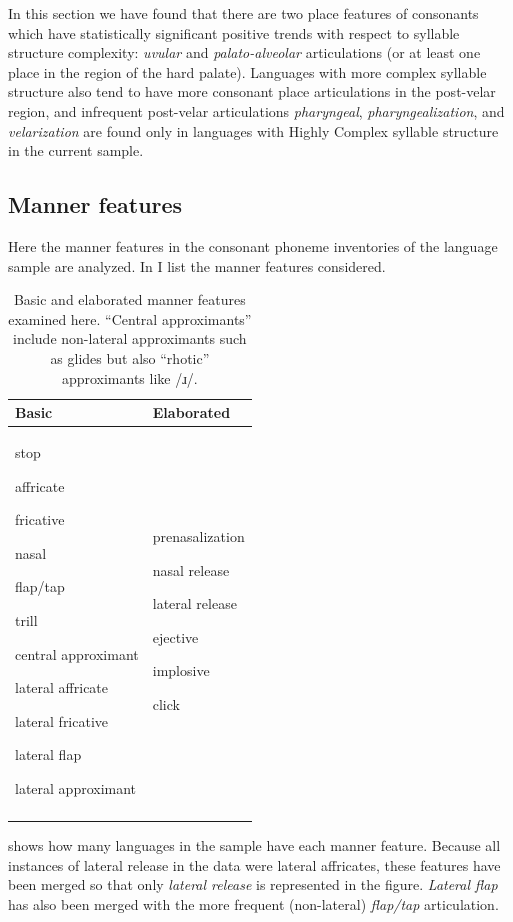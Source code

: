  In this section we have found that there are two place features of consonants which have statistically significant positive trends with respect to syllable structure complexity: \textit{uvular} and \textit{palato-alveolar} articulations (or at least one place in the region of the hard palate). Languages with more complex syllable structure also tend to have more consonant place articulations in the post-velar region, and infrequent post-velar articulations \textit{pharyngeal}, \textit{pharyngealization}, and \textit{velarization} are found only in languages with Highly Complex syllable structure in the current sample.

\subsection{Manner features}\label{sec:4.4.5}

  Here the manner features in the consonant phoneme inventories of the language sample are analyzed. In  I list the manner features considered.

\begin{table}
\begin{tabularx}{\textwidth}{QQ}
\lsptoprule
{Basic} & {Elaborated}\\\midrule
stop

affricate

fricative

nasal

flap/tap

trill

central approximant

lateral affricate

lateral fricative

lateral flap

lateral approximant & prenasalization

nasal release

lateral release

ejective

implosive

click\\
\lspbottomrule
\end{tabularx}
\caption{\label{tab:4.14}Basic and elaborated manner features examined here. ``Central approximants'' include non-lateral approximants such as glides but also ``rhotic'' approximants like /ɹ/.}
\end{table}

   shows how many languages in the sample have each manner feature. Because all instances of lateral release in the data were lateral affricates, these features have been merged so that only \textit{lateral release} is represented in the figure. \textit{Lateral flap} has also been merged with the more frequent (non-lateral) \textit{flap/tap} articulation.

